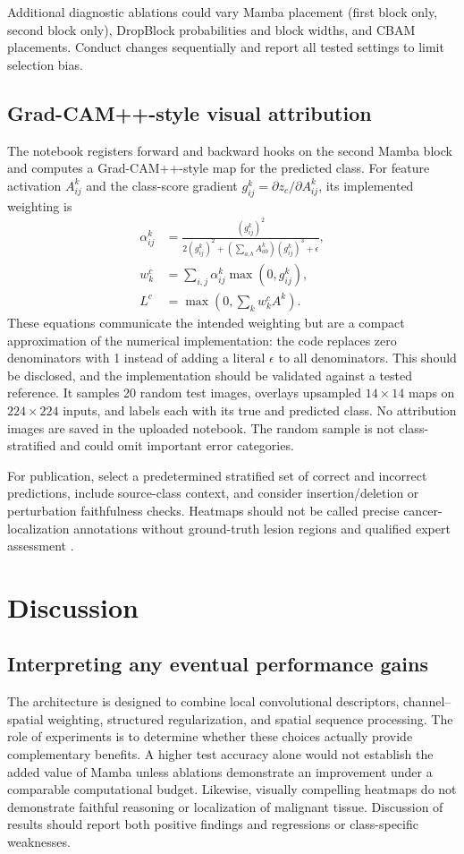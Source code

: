 \documentclass[11pt,a4paper]{article}
\begin{document}
Additional diagnostic ablations could vary Mamba placement (first block only, second block only), DropBlock probabilities and block widths, and CBAM placements. Conduct changes sequentially and report all tested settings to limit selection bias.

\subsection{Grad-CAM++-style visual attribution}
The notebook registers forward and backward hooks on the second Mamba block and computes a Grad-CAM++-style map for the predicted class. For feature activation $A^k_{ij}$ and the class-score gradient $g^k_{ij}=\partial z_c/\partial A^k_{ij}$, its implemented weighting is
\begin{align}
\alpha^k_{ij} &= \frac{(g^k_{ij})^2}{2(g^k_{ij})^2+\left(\sum_{a,b}A^k_{ab}\right)(g^k_{ij})^3+\epsilon},\\
 w_k^c &= \sum_{i,j}\alpha^k_{ij}\max(0,g^k_{ij}),\\
 L^c &= \max\left(0,\sum_k w_k^c A^k\right).
\end{align}
These equations communicate the intended weighting but are a compact approximation of the numerical implementation: the code replaces zero denominators with 1 instead of adding a literal $\epsilon$ to all denominators. This should be disclosed, and the implementation should be validated against a tested reference. It samples 20 random test images, overlays upsampled $14\times14$ maps on $224\times224$ inputs, and labels each with its true and predicted class. No attribution images are saved in the uploaded notebook. The random sample is not class-stratified and could omit important error categories.

For publication, select a predetermined stratified set of correct and incorrect predictions, include source-class context, and consider insertion/deletion or perturbation faithfulness checks. Heatmaps should not be called precise cancer-localization annotations without ground-truth lesion regions and qualified expert assessment \citep{chattopadhyay2018gradcampp}.

\section{Discussion}\label{sec:discussion}
\subsection{Interpreting any eventual performance gains}
The architecture is designed to combine local convolutional descriptors, channel--spatial weighting, structured regularization, and spatial sequence processing. The role of experiments is to determine whether these choices actually provide complementary benefits. A higher test accuracy alone would not establish the added value of Mamba unless ablations demonstrate an improvement under a comparable computational budget. Likewise, visually compelling heatmaps do not demonstrate faithful reasoning or localization of malignant tissue. Discussion of results should report both positive findings and regressions or class-specific weaknesses.
\end{document}

